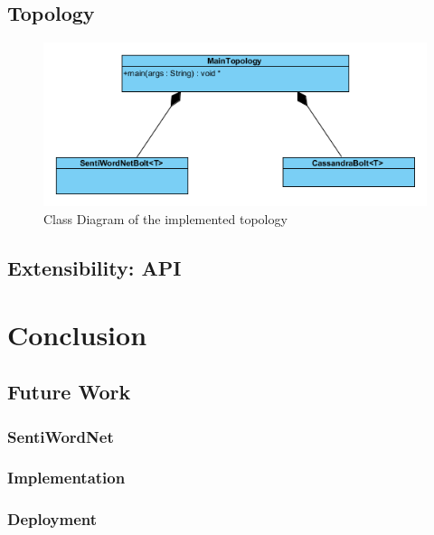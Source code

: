 \documentclass[a4paper]{article}
\begin{document}
\subsection{Topology}\label{section_topology}
\begin{figure}[h]
	\centering
	\includegraphics{images/uml_topology.png}
	\caption{Class Diagram of the implemented topology}
	\label{uml_topology}
\end{figure}

\subsection{Extensibility: API}\label{section_api}

\section{Conclusion}
\subsection{Future Work}
\subsubsection{SentiWordNet}
\subsubsection{Implementation}
\subsubsection{Deployment}



\clearpage



\newpage
\appendix
\end{document}
